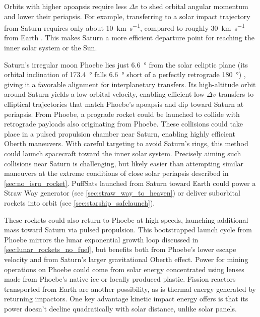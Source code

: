 \documentclass{article}
\newcommand{\deltav}{\Delta v}
\begin{document}
Orbits with higher apoapsis require less $\deltav$ to shed orbital angular momentum and lower their periapsis. For example, transferring to a solar impact trajectory from Saturn requires only about \SI{10}{\kilo\meter\per\second}, compared to roughly \SI{30}{\kilo\meter\per\second} from Earth \cite{Katz_aim_is_all_you_need_2025}. This makes Saturn a more efficient departure point for reaching the inner solar system or the Sun.

Saturn's irregular moon Phoebe lies just \SI{6.6}{\degree} from the solar ecliptic plane (its orbital inclination of \SI{173.4}{\degree} falls \SI{6.6}{\degree} short of a perfectly retrograde \SI{180}{\degree}) \cite{phoebe}, giving it a favorable alignment for interplanetary transfers. Its high-altitude orbit around Saturn yields a low orbital velocity, enabling efficient low $\deltav$ transfers to elliptical trajectories that match Phoebe's apoapsis and dip toward Saturn at periapsis.  From Phoebe, a prograde rocket could be launched to collide with retrograde payloads also originating from Phoebe. These collisions could take place in a pulsed propulsion chamber near Saturn, enabling highly efficient Oberth maneuvers. With careful targeting to avoid Saturn's rings, this method could launch spacecraft toward the inner solar system. Precisely aiming such collisions near Saturn is challenging, but likely easier than attempting similar maneuvers at the extreme conditions of close solar periapsis described in \autoref{sec:no_isru_rocket}. PuffSats launched from Saturn toward Earth could power a Straw Way generator (see \autoref{sec:straw_way_to_heaven}) or deliver suborbital rockets into orbit (see \autoref{sec:starship_safelaunch}).

These rockets could also return to Phoebe at high speeds, launching additional mass toward Saturn via pulsed propulsion. This bootstrapped launch cycle from Phoebe mirrors the lunar exponential growth loop discussed in \autoref{sec:lunar_rockets_no_fuel}, but benefits both from Phoebe's lower escape velocity and from Saturn's larger gravitational Oberth effect. Power for mining operations on Phoebe could come from solar energy concentrated using lenses made from Phoebe's native ice or locally produced plastic. Fission reactors transported from Earth are another possibility, as is thermal energy generated by returning impactors.  One key advantage kinetic impact energy offers is that its power doesn't decline quadratically with solar distance, unlike solar panels.
\end{document}
